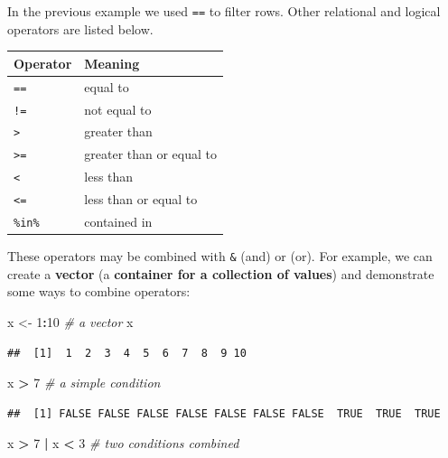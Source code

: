 \documentclass[]{book}
\newenvironment{Shaded}{\begin{snugshade}}{\end{snugshade}}
\newcommand{\DecValTok}[1]{\textcolor[rgb]{0.00,0.00,0.81}{#1}}
\newcommand{\StringTok}[1]{\textcolor[rgb]{0.31,0.60,0.02}{#1}}
\newcommand{\CommentTok}[1]{\textcolor[rgb]{0.56,0.35,0.01}{\textit{#1}}}
\newcommand{\OperatorTok}[1]{\textcolor[rgb]{0.81,0.36,0.00}{\textbf{#1}}}
\newcommand{\NormalTok}[1]{#1}
\begin{document}
In the previous example we used \texttt{==} to filter rows. Other
relational and logical operators are listed below.

\begin{longtable}[]{@{}ll@{}}
\toprule
Operator & Meaning\tabularnewline
\midrule
\endhead
\texttt{==} & equal to\tabularnewline
\texttt{!=} & not equal to\tabularnewline
\texttt{\textgreater{}} & greater than\tabularnewline
\texttt{\textgreater{}=} & greater than or equal to\tabularnewline
\texttt{\textless{}} & less than\tabularnewline
\texttt{\textless{}=} & less than or equal to\tabularnewline
\texttt{\%in\%} & contained in\tabularnewline
\bottomrule
\end{longtable}

These operators may be combined with \texttt{\&} (and) or
\texttt{\textbar{}} (or). For example, we can create a \textbf{vector}
(a \textbf{container for a collection of values}) and demonstrate some
ways to combine operators:

\begin{Shaded}
\begin{Highlighting}[]
\NormalTok{x <-}\StringTok{ }\DecValTok{1}\OperatorTok{:}\DecValTok{10} \CommentTok{# a vector}
\NormalTok{x}
\end{Highlighting}
\end{Shaded}

\begin{verbatim}
##  [1]  1  2  3  4  5  6  7  8  9 10
\end{verbatim}

\begin{Shaded}
\begin{Highlighting}[]
\NormalTok{x }\OperatorTok{>}\StringTok{ }\DecValTok{7} \CommentTok{# a simple condition}
\end{Highlighting}
\end{Shaded}

\begin{verbatim}
##  [1] FALSE FALSE FALSE FALSE FALSE FALSE FALSE  TRUE  TRUE  TRUE
\end{verbatim}

\begin{Shaded}
\begin{Highlighting}[]
\NormalTok{x }\OperatorTok{>}\StringTok{ }\DecValTok{7} \OperatorTok{|}\StringTok{ }\NormalTok{x }\OperatorTok{<}\StringTok{ }\DecValTok{3} \CommentTok{# two conditions combined}
\end{Highlighting}
\end{Shaded}
\end{document}
